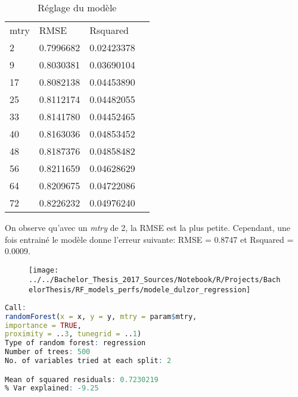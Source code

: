 \begin{table}[H]
	\centering
	\caption{Réglage du modèle}
	\label{RF_Dulzor_Resampling}
	\begin{tabular}{llll}
	mtry & RMSE      & Rsquared   \\
	2    & 0.7996682 & 0.02423378 \\
	9    & 0.8030381 & 0.03690104 \\
	17   & 0.8082138 & 0.04453890 \\
	25   & 0.8112174 & 0.04482055 \\
	33   & 0.8141780 & 0.04452465 \\
	40   & 0.8163036 & 0.04853452 \\
	48   & 0.8187376 & 0.04858482 \\
	56   & 0.8211659 & 0.04628629 \\
	64   & 0.8209675 & 0.04722086 \\
	72   & 0.8226232 & 0.04976240
	\end{tabular}
\end{table}

\noindent On observe qu'avec un \textit{mtry} de 2, la RMSE est la plus petite. Cependant, une fois entrainé le modèle donne l'erreur suivante: RMSE = 0.8747  et Rsquared = 0.0009. 

\begin{figure}
	\centering
	\texttt{[image: ../../Bachelor\_Thesis\_2017\_Sources/Notebook/R/Projects/BachelorThesis/RF\_models\_perfs/modele\_dulzor\_regression]}
	\caption{}
	\label{fig:modeledulzorregression}
\end{figure}



\begin{minipage}{\linewidth}
	
	\begin{lstlisting}[showstringspaces=false,language=R, caption={Test du modèle de classification},captionpos=b]
Call:
randomForest(x = x, y = y, mtry = param$mtry, 
importance = TRUE,      
proximity = ..3, tunegrid = ..1) 
Type of random forest: regression
Number of trees: 500
No. of variables tried at each split: 2

Mean of squared residuals: 0.7230219
% Var explained: -9.25
	\end{lstlisting}
\end{minipage}


